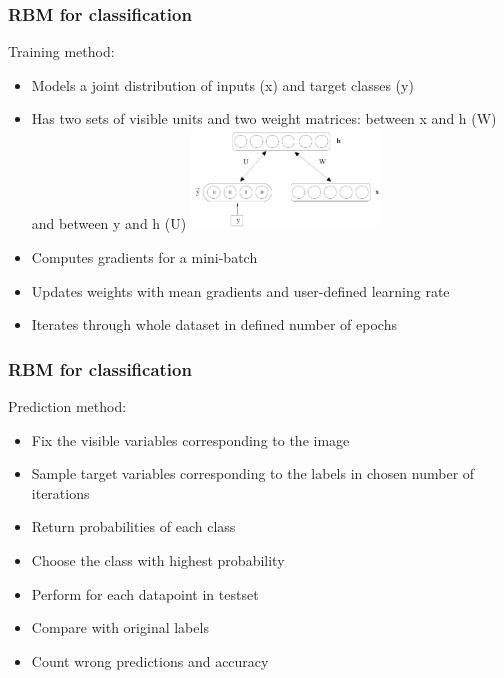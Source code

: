 \documentclass{beamer}
\begin{document}
  \begin{frame}
  \frametitle{RBM for classification}
  Training method:
  \begin{itemize}
	\item Models a joint distribution of inputs (x) and target classes (y)
	\item Has two sets of visible units and two weight matrices: between x and h (W) and between y and h (U)
	\includegraphics[width=5cm]{images/jointProbModel.png}
	\item Computes gradients for a mini-batch 
	\item Updates weights with mean gradients and user-defined learning rate
	\item Iterates through whole dataset in defined number of epochs
	\end{itemize}
  \end{frame}
  \begin{frame}
  \frametitle{RBM for classification}
  Prediction method:
  \begin{itemize}
	\item Fix the visible variables corresponding to the image
	\item Sample target variables corresponding to the labels in chosen number of iterations
	\item Return probabilities of each class 
	\item Choose the class with highest probability
	\item Perform for each datapoint in testset
	\item Compare with original labels
	\item Count wrong predictions and accuracy
	\end{itemize}
  \end{frame}
\end{document}

